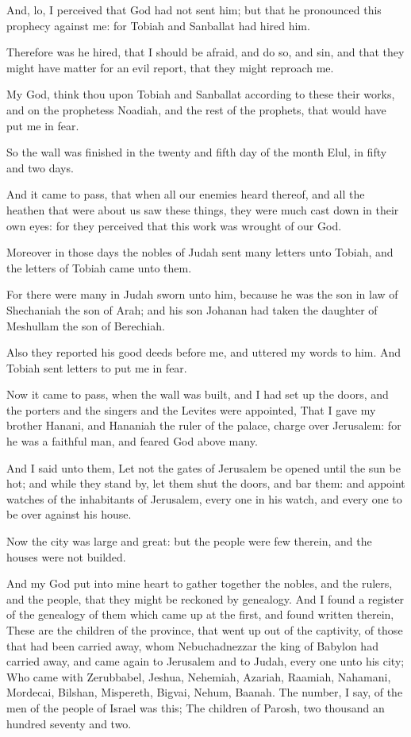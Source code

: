 \Verse And, lo, I perceived that God had not sent him; but that he pronounced this prophecy against me: for Tobiah and Sanballat had hired him.

\Verse Therefore was he hired, that I should be afraid, and do so, and sin, and that they might have matter for an evil report, that they might reproach me.

\Verse My God, think thou upon Tobiah and Sanballat according to these their works, and on the prophetess Noadiah, and the rest of the prophets, that would have put me in fear.

\Verse So the wall was finished in the twenty and fifth day of the month Elul, in fifty and two days.

\Verse And it came to pass, that when all our enemies heard thereof, and all the heathen that were about us saw these things, they were much cast down in their own eyes: for they perceived that this work was wrought of our God.

\Verse Moreover in those days the nobles of Judah sent many letters unto Tobiah, and the letters of Tobiah came unto them.

\Verse For there were many in Judah sworn unto him, because he was the son in law of Shechaniah the son of Arah; and his son Johanan had taken the daughter of Meshullam the son of Berechiah.

\Verse Also they reported his good deeds before me, and uttered my words to him. And Tobiah sent letters to put me in fear.


\Chapter
\Verse Now it came to pass, when the wall was built, and I had set up the doors, and the porters and the singers and the Levites were appointed, \Verse That I gave my brother Hanani, and Hananiah the ruler of the palace, charge over Jerusalem: for he was a faithful man, and feared God above many.

\Verse And I said unto them, Let not the gates of Jerusalem be opened until the sun be hot; and while they stand by, let them shut the doors, and bar them: and appoint watches of the inhabitants of Jerusalem, every one in his watch, and every one to be over against his house.

\Verse Now the city was large and great: but the people were few therein, and the houses were not builded.

\Verse And my God put into mine heart to gather together the nobles, and the rulers, and the people, that they might be reckoned by genealogy.  And I found a register of the genealogy of them which came up at the first, and found written therein, \Verse These are the children of the province, that went up out of the captivity, of those that had been carried away, whom Nebuchadnezzar the king of Babylon had carried away, and came again to Jerusalem and to Judah, every one unto his city; \Verse Who came with Zerubbabel, Jeshua, Nehemiah, Azariah, Raamiah, Nahamani, Mordecai, Bilshan, Mispereth, Bigvai, Nehum, Baanah. The number, I say, of the men of the people of Israel was this; \Verse The children of Parosh, two thousand an hundred seventy and two.

